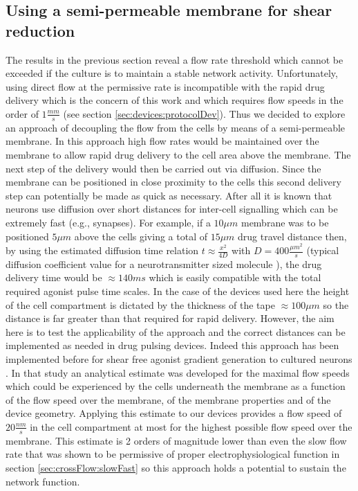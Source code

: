         \subsection{Using a semi-permeable membrane for shear reduction}
        \label{sec:crossFlow:membrane}
        The results in the previous section reveal a flow rate threshold which cannot be exceeded if the culture is to maintain a stable network activity. Unfortunately, using direct flow at the permissive rate is incompatible with the rapid drug delivery which is the concern of this work and which requires flow speeds in the order of \(1 \frac{mm}{s}\) (see section \ref{sec:devices:protocolDev}). Thus we decided to explore an approach of decoupling the flow from the cells by means of a semi-permeable membrane. In this approach high flow rates would be maintained over the membrane to allow rapid drug delivery to the cell area above the membrane. The next step of the delivery would then be carried out via diffusion. Since the membrane can be positioned in close proximity to the cells this second delivery step can potentially be made as quick as necessary. After all it is known that neurons use diffusion over short distances for inter-cell signalling which can be extremely fast (e.g., synapses). For example, if a \(10 \mu m\) membrane was to be positioned \(5 \mu m\) above the cells giving a total of \(15 \mu m\) drug travel distance then, by using the estimated diffusion time relation \(t\approx \frac{x^2}{4D}\) with \(D=400\frac{\mu m^2}{s}\) (typical diffusion coefficient value for a neurotransmitter sized molecule \cite{johnstoneThesis}), the drug delivery time would be \(\approx 140 ms\) which is easily compatible with the total required agonist pulse time scales. In the case of the devices used here the height of the cell compartment is dictated by the thickness of the tape \(\approx 100\mu m\) so the distance is far greater than that required for rapid delivery. However, the aim here is to test the applicability of the approach and the correct distances can be implemented as needed in drug pulsing devices. Indeed this approach has been implemented before for shear free agonist gradient generation to cultured neurons \cite{morel2012amplification,morel2012concentration}. In that study an analytical estimate was developed for the maximal flow speeds which could be experienced by the cells underneath the membrane as a function of the flow speed over the membrane, of the membrane properties and of the device geometry. Applying this estimate to our devices provides a flow speed of \(20 \frac{nm}{s}\) in the cell compartment at most for the highest possible flow speed over the membrane. This estimate is 2 orders of magnitude lower than even the slow flow rate that was shown to be permissive of proper electrophysiological function in section \ref{sec:crossFlow:slowFast} so this approach holds a potential to sustain the network function.

